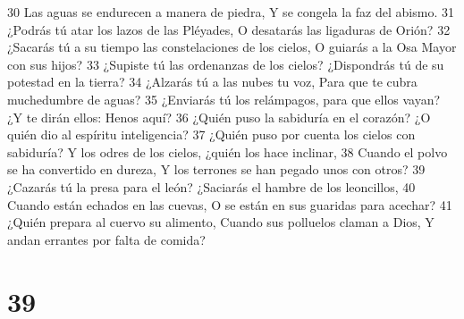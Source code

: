30 Las aguas se endurecen a manera de piedra,
Y se congela la faz del abismo.
31 ¿Podrás tú atar los lazos de las Pléyades,
O desatarás las ligaduras de Orión? 
32 ¿Sacarás tú a su tiempo las constelaciones de los cielos,
O guiarás a la Osa Mayor con sus hijos?
33 ¿Supiste tú las ordenanzas de los cielos?
¿Dispondrás tú de su potestad en la tierra?
34 ¿Alzarás tú a las nubes tu voz,
Para que te cubra muchedumbre de aguas?
35 ¿Enviarás tú los relámpagos, para que ellos vayan?
¿Y te dirán ellos: Henos aquí?
36 ¿Quién puso la sabiduría en el corazón?
¿O quién dio al espíritu inteligencia?
37 ¿Quién puso por cuenta los cielos con sabiduría?
Y los odres de los cielos, ¿quién los hace inclinar,
38 Cuando el polvo se ha convertido en dureza,
Y los terrones se han pegado unos con otros?
39 ¿Cazarás tú la presa para el león?
¿Saciarás el hambre de los leoncillos,
40 Cuando están echados en las cuevas,
O se están en sus guaridas para acechar?
41 ¿Quién prepara al cuervo su alimento,
Cuando sus polluelos claman a Dios,
Y andan errantes por falta de comida?

\chapter{39}

